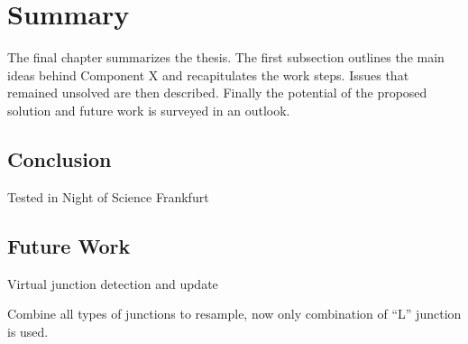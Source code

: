 \chapter{Summary\label{cha:chapter7}}
The final chapter summarizes the thesis. The first subsection outlines the main ideas behind Component X and recapitulates the work steps. Issues that remained unsolved are then described. Finally the potential of the proposed solution and future work is surveyed in an outlook.

\section{Conclusion\label{sec:conclusion}}
Tested in Night of Science Frankfurt

\section{Future Work\label{sec:future}}
Virtual junction detection and update

Combine all types of junctions to resample, now only combination of ``L'' junction is used.

